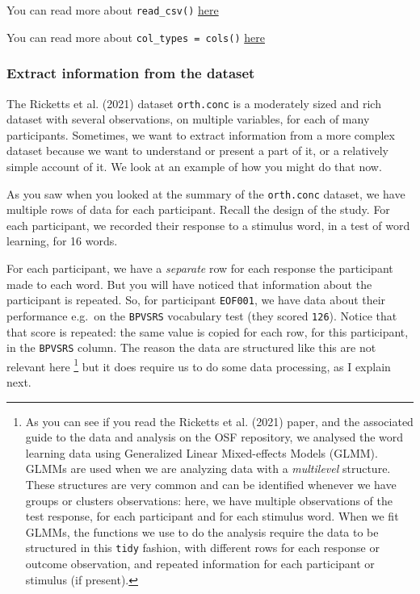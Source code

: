 \documentclass[
  letterpaper,
  DIV=11,
  numbers=noendperiod]{scrreprt}
\begin{document}
You can read more about \texttt{read\_csv()}
\href{https://readr.tidyverse.org/reference/read_delim.html}{here}

You can read more about \texttt{col\_types\ =\ cols()}
\href{https://readr.tidyverse.org/reference/cols.html}{here}

\hypertarget{sec-get-distinct}{%
\subsubsection{Extract information from the
dataset}\label{sec-get-distinct}}

The Ricketts et al. (2021) dataset \texttt{orth.conc} is a moderately
sized and rich dataset with several observations, on multiple variables,
for each of many participants. Sometimes, we want to extract information
from a more complex dataset because we want to understand or present a
part of it, or a relatively simple account of it. We look at an example
of how you might do that now.

As you saw when you looked at the summary of the \texttt{orth.conc}
dataset, we have multiple rows of data for each participant. Recall the
design of the study. For each participant, we recorded their response to
a stimulus word, in a test of word learning, for 16 words.

For each participant, we have a \emph{separate} row for each response
the participant made to each word. But you will have noticed that
information about the participant is repeated. So, for participant
\texttt{EOF001}, we have data about their performance e.g.~on the
\texttt{BPVSRS} vocabulary test (they scored \texttt{126}). Notice that
that score is repeated: the same value is copied for each row, for this
participant, in the \texttt{BPVSRS} column. The reason the data are
structured like this are not relevant here \footnote{As you can see if
  you read the Ricketts et al. (2021) paper, and the associated guide to
  the data and analysis on the OSF repository, we analysed the word
  learning data using Generalized Linear Mixed-effects Models (GLMM).
  GLMMs are used when we are analyzing data with a \emph{multilevel}
  structure. These structures are very common and can be identified
  whenever we have groups or clusters observations: here, we have
  multiple observations of the test response, for each participant and
  for each stimulus word. When we fit GLMMs, the functions we use to do
  the analysis require the data to be structured in this \texttt{tidy}
  fashion, with different rows for each response or outcome observation,
  and repeated information for each participant or stimulus (if
  present).} but it does require us to do some data processing, as I
explain next.
\end{document}
